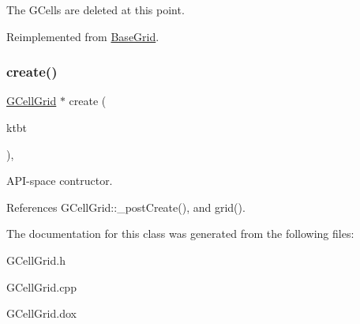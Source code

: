 The G\+Cells are deleted at this point. 

Reimplemented from \hyperlink{classKatabatic_1_1BaseGrid}{Base\+Grid}.

\mbox{\label{classKatabatic_1_1GCellGrid_a19a45b2e6c6b9ca8898b2fde035d1827}} 
\subsubsection{\texorpdfstring{create()}{create()}}
{\footnotesize\ttfamily \hyperlink{classKatabatic_1_1GCellGrid}{G\+Cell\+Grid} $\ast$ create (\begin{DoxyParamCaption}\item[{\hyperlink{classKatabatic_1_1KatabaticEngine}{Katabatic\+Engine} $\ast$}]{ktbt }\end{DoxyParamCaption})\hspace{0.3cm}{\ttfamily [static]}, {\ttfamily [protected]}}

A\+P\+I-\/space contructor. 

References G\+Cell\+Grid\+::\+\_\+post\+Create(), and grid().



The documentation for this class was generated from the following files\+:\begin{DoxyCompactItemize}
\item 
G\+Cell\+Grid.\+h\item 
G\+Cell\+Grid.\+cpp\item 
G\+Cell\+Grid.\+dox\end{DoxyCompactItemize}
